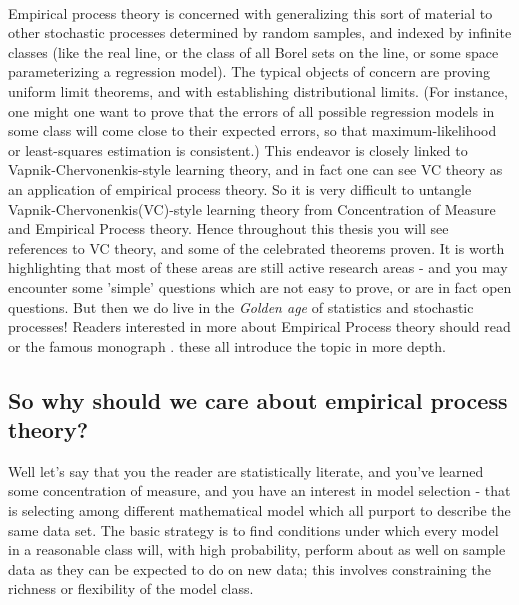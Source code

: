 \documentclass[12pt, oneside, a4paper]{article}
\theoremstyle{plain}
\theoremstyle{definition}
\begin{document}
\paragraph{} Empirical process theory is concerned with generalizing this sort of material to other stochastic processes determined by random samples, 
and indexed by infinite classes (like the real line, or the class of all Borel sets on the line, or some space parameterizing a regression model). The 
typical objects of concern are proving uniform limit theorems, 
and with establishing distributional limits. (For instance, one might one want to prove that the errors of all possible regression models in some class 
will come close to their expected errors, so that maximum-likelihood or least-squares estimation is consistent.) 
This endeavor is closely linked to Vapnik-Chervonenkis-style learning theory, and in fact one can see VC theory as an application of empirical process 
theory. So it is very difficult to untangle Vapnik-Chervonenkis(VC)-style learning theory from Concentration of Measure and Empirical Process theory.
Hence throughout this thesis you will see references to VC theory, and some of the celebrated theorems proven. It is worth highlighting that most of 
these areas are still active research areas - and you may encounter some 'simple' questions which are not easy to prove, or are in fact open questions.
But then we do live in the \textit{Golden age} of statistics and stochastic processes! 
Readers interested in more about Empirical Process theory should read 
\cite{vapnik2000nature,dudley1999uniform,massart,boucheron2013concentration} or the famous monograph \cite{Pollard1990}.
these all introduce the topic in more depth.
\subsection{So why should we care about empirical process theory?}\label{sec:MachineLearning}
Well let's say that you the reader are statistically literate, and you've 
learned some concentration of measure, and you have an interest in model selection - that is selecting among different mathematical 
model which all purport to describe the same data set. The basic strategy is to find conditions under which every model in a 
reasonable class will, with high probability, perform about as well on sample data as they can be expected to do on new data; this 
involves constraining the richness or flexibility of the model class.   
\end{document}
